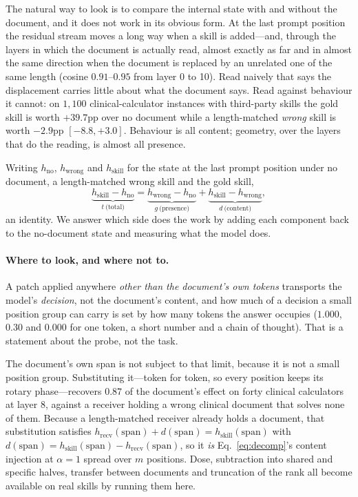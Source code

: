 \documentclass{article}
\newcommand{\dvec}{\ensuremath{d}}
\newcommand{\gvec}{\ensuremath{g}}
\newcommand{\tvec}{\ensuremath{t}}
\begin{document}
The natural way to look is to compare the internal state with and without the
document, and it does not work in its obvious form. At the last prompt position
the residual stream moves a long way when a skill is added---and, through the
layers in which the document is actually read, almost exactly as far and in
almost the same direction when the document is replaced by an unrelated one of
the same length (cosine $0.91$--$0.95$ from layer 0 to 10). Read naively that
says the displacement carries little about what the document says. Read against
behaviour it cannot: on $1{,}100$ clinical-calculator instances with third-party
skills the gold skill is worth $+39.7$pp over no document while a length-matched
\emph{wrong} skill is worth $-2.9$pp $[-8.8, +3.0]$. Behaviour is all content;
geometry, over the layers that do the reading, is almost all presence.

Writing $h_{\text{no}}$, $h_{\text{wrong}}$ and $h_{\text{skill}}$ for the state
at the last prompt position under no document, a length-matched wrong skill and
the gold skill,
\begin{equation}
\underbrace{h_{\text{skill}} - h_{\text{no}}}_{\tvec\ \text{(total)}}
=
\underbrace{h_{\text{wrong}} - h_{\text{no}}}_{\gvec\ \text{(presence)}}
+
\underbrace{h_{\text{skill}} - h_{\text{wrong}}}_{\dvec\ \text{(content)}} ,
\label{eq:decomp}
\end{equation}
an identity. We answer which side does the work by adding each component back to
the no-document state and measuring what the model does.

\paragraph{Where to look, and where not to.} A patch applied anywhere
\emph{other than the document's own tokens} transports the model's
\emph{decision}, not the document's content, and how much of a decision a small
position group can carry is set by how many tokens the answer occupies
($1.000$, $0.30$ and $0.000$ for one token, a short number and a chain of
thought). That is a statement about the probe, not the task.

The document's own span is not subject to that limit, because it is not a small
position group. Substituting it---token for token, so every position keeps its
rotary phase---recovers $0.87$ of the document's effect on forty clinical
calculators at layer $8$, against a receiver holding a wrong clinical document
that solves none of them. Because a
length-matched receiver already holds a document, that substitution satisfies
$h_{\text{recv}}(\text{span}) + \dvec(\text{span}) = h_{\text{skill}}(\text{span})$
with $\dvec(\text{span}) = h_{\text{skill}}(\text{span}) -
h_{\text{recv}}(\text{span})$, so it \emph{is} Eq.~\ref{eq:decomp}'s content
injection at $\alpha = 1$ spread over $m$ positions. Dose, subtraction into
shared and specific halves, transfer between documents and truncation of the
rank all become available on real skills by running them here.
\end{document}
